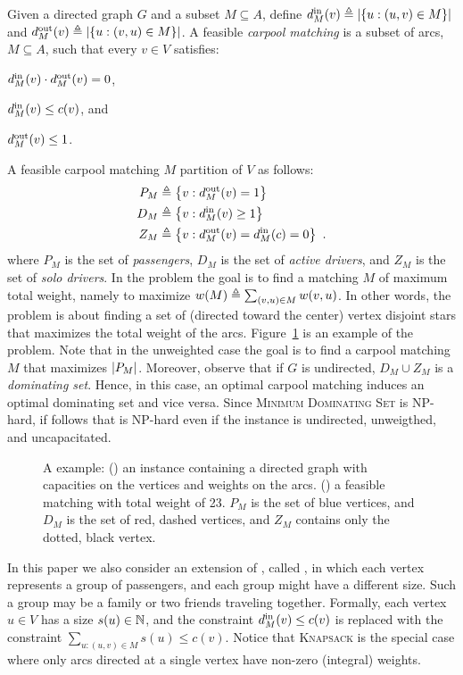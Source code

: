 Given a directed graph $G$ and a subset $M \subseteq A$, define
$\din[M](v) \eqdf \abs{\set{u :(u,v) \in M}}$ and
$\dout[M](v) \eqdf \abs{\set{u :(v,u) \in M}}$.
%
A feasible \emph{carpool matching} is a subset of arcs, $M \subseteq
A$, such that every $v \in V$ satisfies:%
\begin{inparaenum}[(i)]
\item $\din[M](v) \cdot \dout[M](v) = 0$,
\item $\din[M](v) \leq c(v)$, and 
\item $\dout[M](v) \leq 1$.
\end{inparaenum}
A feasible carpool matching $M$ partition of $V$ as follows:
\begin{align*}
P_M & \eqdf \set{v : \dout[M](v) = 1} \\
D_M & \eqdf \set{v : \din[M](v) \geq 1} \\
Z_M & \eqdf \set{v : \dout[M](v) = \din[M](c) = 0}
~.
\end{align*}
where $P_M$ is the set of \emph{passengers}, $D_M$ is the set of
\emph{active drivers}, and $Z_M$ is the set of \emph{solo drivers}.
%
In the \carpool problem the goal is to find a matching $M$ of maximum
total weight, namely to maximize $w(M) \eqdf \sum_{(v,u) \in M}
w(v,u)$.  In other words, the \carpool problem is about finding a set
of (directed toward the center) vertex disjoint stars that maximizes
the total weight of the arcs.  
%
Figure~\ref{fig:carpool} is an example of the \carpool problem.
%
Note that in the unweighted case the goal is to find a carpool
matching $M$ that maximizes $\abs{P_M}$.
%
Moreover, observe that if $G$ is undirected, $D_M \cup Z_M$ is
a \emph{dominating set}.  Hence, in this case, an optimal carpool
matching induces an optimal dominating set and vice versa.
Since \textsc{Minimum Dominating Set} is NP-hard, if follows
that \carpool is NP-hard even if the instance is undirected,
unweigthed, and uncapacitated.

\begin{figure}
\centering

\caption[]{
\label{fig:carpool}
A \carpool example: () an instance containing a
directed graph with capacities on the vertices and weights on the
arcs.  () a feasible matching with total weight
of 23.  $P_M$ is the set of blue vertices, and $D_M$ is the set of
red, dashed vertices, and $Z_M$ contains only the dotted, black
vertex.  }
\end{figure}  

In this paper we also consider an extension of \carpool, called \gcp,
in which each vertex represents a group of passengers, and each group
might have a different size.  Such a group may be a family or two
friends traveling together.  Formally, each vertex $u \in V$ has a
size $s(u) \in \N$, and the constraint $\din[M](v) \leq c(v)$ is
replaced with the constraint $\sum_{u:(u,v) \in M} s(u) \leq c(v)$.
%
Notice that \textsc{Knapsack} is the special case where only arcs
directed at a single vertex have non-zero (integral) weights.

